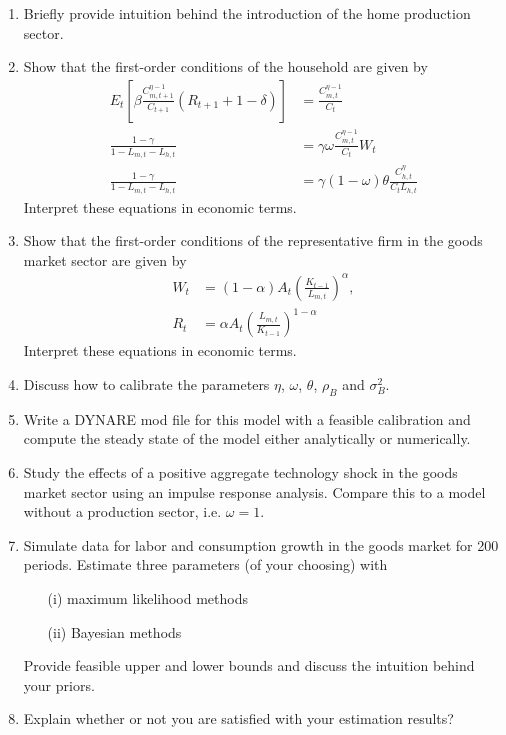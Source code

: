 \documentclass[a4paper]{scrartcl}
\newif\ifSolutEnd  %
\begin{document}
\begin{enumerate}
	\item Briefly provide intuition behind the introduction of the home production sector.
	\item Show that the first-order conditions of the household are given by
	\begin{align*}
	E_t\left[\beta \frac{ C_{m,t+1}^{\eta-1}}{C_{t+1}}\left(R_{t+1}+1-\delta \right) \right] &= \frac{C_{m,t}^{\eta-1}}{C_t}\\
	\frac{1-\gamma}{1-L_{m,t}-L_{h,t}} &= \gamma \omega \frac{ C_{m,t}^{\eta-1}}{C_t} W_t\\
	\frac{1-\gamma}{1-L_{m,t}-L_{h,t}} &= \gamma (1-\omega) \theta \frac{ C_{h,t}^{\eta}}{C_t L_{h,t}}
	\end{align*}
	Interpret these equations in economic terms.
	
	\item Show that the first-order conditions of the representative firm in the goods market sector are given by
	\begin{align*}
	W_t &= (1-\alpha) A_t \left(\frac{K_{t-1}}{L_{m,t}}\right)^\alpha, \\	
	R_t &= \alpha A_t \left(\frac{L_{m,t}}{K_{t-1}}\right)^{1-\alpha}
	\end{align*}
	Interpret these equations in economic terms.
	\item Discuss how to calibrate the parameters $\eta$, $\omega$, $\theta$, $\rho_B$ and $\sigma_B^2$.
	\item Write a DYNARE mod file for this model with a feasible calibration and compute the steady state of the model either analytically or numerically.
	\item Study the effects of a positive aggregate technology shock in the goods market sector using an impulse response analysis. Compare this to a model without a production sector, i.e. $\omega=1$.
	\item Simulate data for labor and consumption growth in the goods market for 200 periods. Estimate three parameters (of your choosing) with 
	\begin{itemize}
		\item[(i)] maximum likelihood methods
		\item[(ii)] Bayesian methods
	\end{itemize}
	Provide feasible upper and lower bounds and discuss the intuition behind your priors. 
	\item Explain whether or not you are satisfied with your estimation results?
\end{enumerate} 


\newpage
\fi
\newpage



\ifSolutEnd
\newpage
\appendix
\section{Solutions}

\fi
\end{document}
